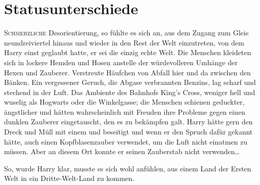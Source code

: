\chapter{Statusunterschiede}

\lettrine{S}{chmerzliche} Desorientierung, so fühlte es sich an, aus dem Zugang zum Gleis neundreiviertel hinaus und wieder in den Rest der Welt einzutreten, von dem Harry einst geglaubt hatte, er sei die einzig echte Welt. Die Menschen kleideten sich in lockere Hemden und Hosen anstelle der würdevolleren Umhänge der Hexen und Zauberer. Verstreute Häufchen von Abfall hier und da zwischen den Bänken. Ein vergessener Geruch, die Abgase verbrannten Benzins, lag scharf und stechend in der Luft. Das Ambiente des Bahnhofs King’s Cross, weniger hell und wuselig als Hogwarts oder die Winkelgasse; die Menschen schienen geduckter, ängstlicher und hätten wahrscheinlich mit Freuden ihre Probleme gegen einen dunklen Zauberer eingetauscht, den es zu bekämpfen galt. Harry hätte gern den Dreck und Müll mit einem  und  beseitigt und wenn er den Spruch dafür gekannt hätte, auch einen Kopfblasenzauber verwendet, um die Luft nicht einatmen zu müssen. Aber an diesem Ort konnte er seinen Zauberstab nicht verwenden…

So, wurde Harry klar, musste es sich wohl anfühlen, aus einem Land der Ersten Welt in ein Dritte-Welt-Land zu kommen.

